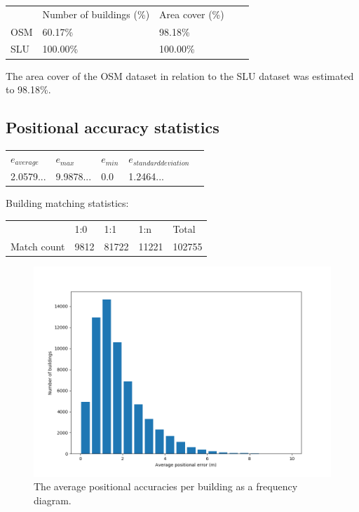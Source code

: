 \documentclass[a4paper]{article}
\begin{document}
\begin{table}[H]
\begin{tabular}{lllll}
    & Number of buildings (\%) & Area cover (\%) \\
    OSM & 60.17\% & 98.18\% \\
    SLU & 100.00\% & 100.00\%
\end{tabular}
\end{table}

The area cover of the OSM dataset in relation to the SLU dataset was estimated to 98.18\%.

\subsection{Positional accuracy statistics}

\begin{table}[H]
\begin{tabular}{lllll}
    $e_{average}$ & $e_{max}$ & $e_{min}$ & $e_{standard deviation}$ \\
    2.0579... & 9.9878... & 0.0 & 1.2464...
\end{tabular}
\end{table}

Building matching statistics:

\begin{table}[H]
\begin{tabular}{lllll}
    & 1:0 & 1:1 & 1:n & Total \\
    Match count & 9812 & 81722 & 11221 & 102755
\end{tabular}
\end{table}


\begin{figure}[H]
    \centering
    \includegraphics[width=\textwidth,height=0.5\textheight,keepaspectratio]{img_pos_error_plot}
    \caption{The average positional accuracies per building as a frequency diagram.}
    \label{fig:space}
\end{figure}
\end{document}
